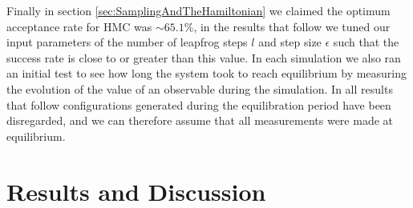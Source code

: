 \documentclass[12pt]{article}
\begin{document}
            Finally in section \ref{sec:SamplingAndTheHamiltonian} we claimed the optimum acceptance rate for HMC was $\sim 65.1\%$, in the results that follow we tuned our input parameters of the number of leapfrog steps $l$ and step size $\epsilon$ such that the success rate is close to or greater than this value. In each simulation we also ran an initial test to see how long the system took to reach equilibrium by measuring the evolution of the value of an observable during the simulation. In all results that follow configurations generated during the equilibration period have been disregarded, and we can therefore assume that all measurements were made at equilibrium.

            
\section{Results and Discussion}
\end{document}
